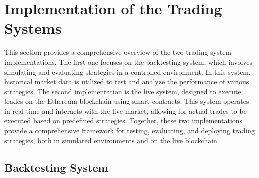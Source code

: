 \chapter{Implementation of the Trading Systems}
This section provides a comprehensive overview of the two trading system implementations. The first one focuses on the backtesting system, which involves simulating and evaluating strategies in a controlled environment. In this system, historical market data is utilized to test and analyze the performance of various strategies. The second implementation is the live system, designed to execute trades on the Ethereum blockchain using smart contracts. This system operates in real-time and interacts with the live market, allowing for actual trades to be executed based on predefined strategies. Together, these two implementations provide a comprehensive framework for testing, evaluating, and deploying trading strategies, both in simulated environments and on the live blockchain.

\section{Backtesting System}

